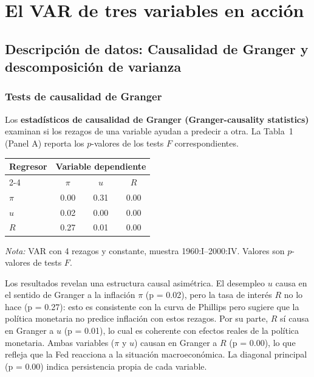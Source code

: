 \documentclass[12pt]{article}
\begin{document}
\section{El VAR de tres variables en acci\'on}

\subsection{Descripci\'on de datos: Causalidad de Granger y descomposici\'on de varianza}

\subsubsection{Tests de causalidad de Granger}

Los \textbf{estad\'isticos de causalidad de Granger (Granger-causality statistics)} examinan si los rezagos de una variable ayudan a predecir a otra. La Tabla~1 (Panel A) reporta los $p$-valores de los tests $F$ correspondientes.

\begin{center}
\begin{tabular}{lccc}
\toprule
\textbf{Regresor} & \multicolumn{3}{c}{\textbf{Variable dependiente}} \\
\cmidrule(lr){2-4}
 & $\pi$ & $u$ & $R$ \\
\midrule
$\pi$ & 0.00 & 0.31 & 0.00 \\
$u$   & 0.02 & 0.00 & 0.00 \\
$R$   & 0.27 & 0.01 & 0.00 \\
\bottomrule
\end{tabular}
\end{center}
\vspace{4pt}
\textit{Nota:} VAR con 4 rezagos y constante, muestra 1960:I--2000:IV. Valores son $p$-valores de tests $F$.

\begin{hallazgo}
Los resultados revelan una estructura causal asim\'etrica. El desempleo $u$ causa en el sentido de Granger a la inflaci\'on $\pi$ (p = 0.02), pero la tasa de inter\'es $R$ no lo hace (p = 0.27): esto es consistente con la curva de Phillips pero sugiere que la pol\'itica monetaria no predice inflaci\'on con estos rezagos. Por su parte, $R$ s\'i causa en Granger a $u$ (p = 0.01), lo cual es coherente con efectos reales de la pol\'itica monetaria. Ambas variables ($\pi$ y $u$) causan en Granger a $R$ (p = 0.00), lo que refleja que la Fed reacciona a la situaci\'on macroecon\'omica. La diagonal principal (p = 0.00) indica persistencia propia de cada variable.
\end{hallazgo}
\end{document}
